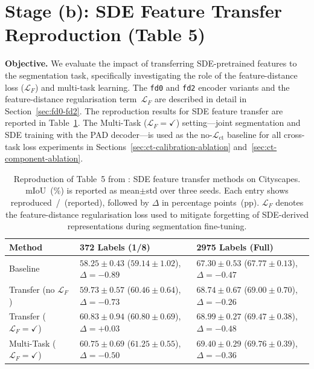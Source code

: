 \section{Stage (b): SDE Feature Transfer Reproduction (Table 5)}
\label{sec:stage_ab_table5}

\noindent
\textbf{Objective.} We evaluate the impact of transferring SDE-pretrained
features to the segmentation task, specifically investigating the role of
the feature-distance loss ($\mathcal{L}_F$) and multi-task learning.
The \texttt{fd0} and \texttt{fd2} encoder variants and the
feature-distance regularisation term~$\mathcal{L}_F$ are described in
detail in Section~\ref{sec:fd0-fd2}. The reproduction results for SDE
feature transfer are reported in Table~\ref{tab:table5_repro}. The
Multi-Task ($\mathcal{L}_F=\checkmark$) setting---joint segmentation and
SDE training with the PAD decoder---is used as the
no-$\mathcal{L}_\text{ct}$ baseline for all cross-task loss experiments
in Sections~\ref{sec:ct-calibration-ablation}
and~\ref{sec:ct-component-ablation}.

\begin{table}[H]
\centering
\caption{Reproduction of Table~5 from \cite{hoyer2023improving}: SDE
feature transfer methods on Cityscapes. mIoU~(\%) is reported as
mean$\pm$std over three seeds. Each entry shows
reproduced~/~{\scriptsize (reported)}, followed by $\Delta$ in
percentage points~(pp). $\mathcal{L}_F$ denotes the feature-distance
regularisation loss used to mitigate forgetting of SDE-derived
representations during segmentation fine-tuning.}
\label{tab:table5_repro}
\renewcommand{\arraystretch}{1.2}
\begin{tabularx}{\textwidth}{lXX}
\toprule
\textbf{Method} &
\textbf{372 Labels (1/8)} &
\textbf{2975 Labels (Full)} \\
\midrule
Baseline &
$58.25 \pm 0.43$ {\scriptsize ($59.14 \pm 1.02$), $\Delta=-0.89$} &
$67.30 \pm 0.53$ {\scriptsize ($67.77 \pm 0.13$), $\Delta=-0.47$} \\
Transfer (no $\mathcal{L}_F$) &
$59.73 \pm 0.57$ {\scriptsize ($60.46 \pm 0.64$), $\Delta=-0.73$} &
$68.74 \pm 0.67$ {\scriptsize ($69.00 \pm 0.70$), $\Delta=-0.26$} \\
Transfer ($\mathcal{L}_F=\checkmark$) &
$60.83 \pm 0.94$ {\scriptsize ($60.80 \pm 0.69$), $\Delta=+0.03$} &
$68.99 \pm 0.27$ {\scriptsize ($69.47 \pm 0.38$), $\Delta=-0.48$} \\
Multi-Task ($\mathcal{L}_F=\checkmark$) &
$60.75 \pm 0.69$ {\scriptsize ($61.25 \pm 0.55$), $\Delta=-0.50$} &
$69.40 \pm 0.29$ {\scriptsize ($69.76 \pm 0.39$), $\Delta=-0.36$} \\
\bottomrule
\end{tabularx}
\end{table}

